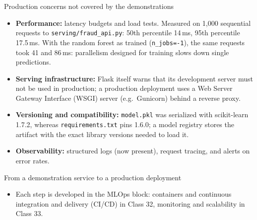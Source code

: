\begin{frame}{Production concerns not covered by the demonstrations}
\begin{itemize}\small
\item \textbf{Performance:} latency budgets and load tests. Measured on 1{,}000 sequential requests to \texttt{serving/fraud\_api.py}: 50th percentile 14\,ms, 95th percentile 17.5\,ms. With the random forest as trained (\texttt{n\_jobs=-1}), the same requests took 41 and 86\,ms: parallelism designed for training slows down single predictions.
\item \textbf{Serving infrastructure:} Flask itself warns that its development server must not be used in production; a production deployment uses a Web Server Gateway Interface (WSGI) server (e.g.\ Gunicorn) behind a reverse proxy.
\item \textbf{Versioning and compatibility:} \texttt{model.pkl} was serialized with scikit-learn 1.7.2, whereas \texttt{requirements.txt} pins 1.6.0; a model registry stores the artifact with the exact library versions needed to load it.
\item \textbf{Observability:} structured logs (now present), request tracing, and alerts on error rates.
\end{itemize}
\coursefooter
\end{frame}

\begin{frame}{From a demonstration service to a production deployment}
\centering
{}
\vspace{0.6em}
\begin{itemize}
\item Each step is developed in the MLOps block: containers and continuous integration and delivery (CI/CD) in Class 32, monitoring and scalability in Class 33.
\end{itemize}
\coursefooter
\end{frame}

